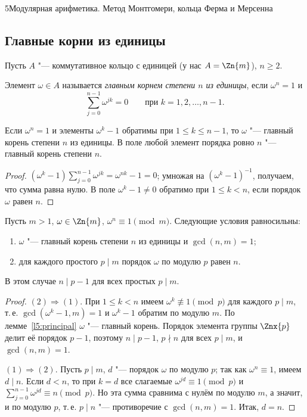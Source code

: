 \begin{lecture}{5}{Модулярная арифметика. Метод Монтгомери, кольца Ферма и Мерсенна}
\subsection{Главные корни из единицы}

Пусть $A$ "--- коммутативное кольцо с единицей (у нас $A = \Zn{m}$), $n \ge 2$.

\begin{definition}
Элемент $\omega \in A$ называется \emph{главным корнем степени $n$ из единицы}, если
$\omega^n = 1$ и
\[
  \sum_{j=0}^{n-1} \omega^{jk} = 0 \qquad \text{при } k = 1, 2, \dots, n - 1.
\]
\end{definition}

\begin{lemma}\label{l5:principal}
Если $\omega^n = 1$ и элементы $\omega^k - 1$ обратимы при $1 \le k \le n - 1$, то $\omega$ "---
главный корень степени $n$ из единицы. В поле любой элемент порядка ровно $n$ "--- главный
корень степени $n$.
\end{lemma}

\begin{proof}
$(\omega^k - 1) \sum_{j=0}^{n-1} \omega^{jk} = \omega^{nk} - 1 = 0$; умножая на
$(\omega^k - 1)^{-1}$, получаем, что сумма равна нулю. В поле $\omega^k - 1 \ne 0$ обратимо при
$1 \le k < n$, если порядок $\omega$ равен $n$.
\end{proof}

\begin{theorem}\label{l5:roots}
Пусть $m > 1$, $\omega \in \Zn{m}$, $\omega^n \equiv 1 \pmod m$. Следующие условия
равносильны:
\begin{enumerate}
  \item $\omega$ "--- главный корень степени $n$ из единицы и $\gcd(n, m) = 1$;
  \item для каждого простого $p \mid m$ порядок $\omega$ по модулю $p$ равен $n$.
\end{enumerate}
В этом случае $n \mid p - 1$ для всех простых $p \mid m$.
\end{theorem}

\begin{proof}
$(2) \Rightarrow (1)$. При $1 \le k < n$ имеем $\omega^k \not\equiv 1 \pmod p$ для каждого
$p \mid m$, т.\,е. $\gcd(\omega^k - 1, m) = 1$ и $\omega^k - 1$ обратим по модулю $m$. По
лемме~\ref{l5:principal} $\omega$ "--- главный корень. Порядок элемента группы $\Znx{p}$ делит
её порядок $p - 1$, поэтому $n \mid p - 1$, $p \nmid n$ для всех $p \mid m$, и $\gcd(n, m) = 1$.

$(1) \Rightarrow (2)$. Пусть $p \mid m$, $d$ "--- порядок $\omega$ по модулю $p$; так как
$\omega^n \equiv 1$, имеем $d \mid n$. Если $d < n$, то при $k = d$ все слагаемые
$\omega^{jd} \equiv 1 \pmod p$ и $\sum_{j=0}^{n-1} \omega^{jd} \equiv n \pmod p$. Но эта сумма
сравнима с нулём по модулю $m$, а значит, и по модулю $p$, т.\,е. $p \mid n$ "--- противоречие с
$\gcd(n, m) = 1$. Итак, $d = n$.
\end{proof}


\end{lecture}
